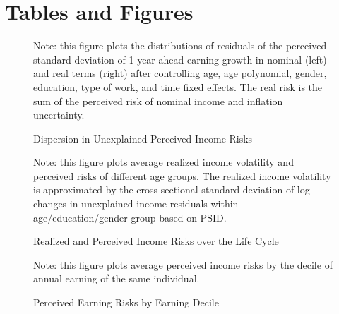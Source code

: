                         \newpage 
   
  \section*{Tables and Figures} 
    
    
        \begin{figure}[!ht]
    \caption{Dispersion in Unexplained Perceived Income Risks}
    \label{fig:histmoms}
	\begin{center}
\end{center}
    \begin{flushleft}Note: this figure plots the distributions of residuals of the perceived standard deviation of 1-year-ahead earning growth in nominal (left) and real terms (right) after controlling age, age polynomial, gender, education, type of work, and time fixed effects. The real risk is the sum of the perceived risk of nominal income and inflation uncertainty.\end{flushleft}
    \end{figure}
    
    \clearpage
    
    \begin{figure}[!ht]
    	\caption{Realized and Perceived Income Risks over the Life Cycle}
    	\label{fig:age_compare}
    	\begin{center}\end{center}
    	\begin{flushleft}Note: this figure plots average realized income volatility and perceived risks of different age groups. The realized income volatility is approximated by the cross-sectional standard deviation of log changes in unexplained income residuals within age/education/gender group based on PSID.\end{flushleft}
    \end{figure}

    \clearpage
    \begin{figure}[!ht]
    	\caption{Perceived Earning Risks by Earning Decile}
    	\label{fig:barplot_byinc}
    	\begin{center}\end{center}
    \begin{flushleft}Note: this figure plots average perceived income risks by the decile of annual earning of the same individual.\end{flushleft}
    \end{figure}
    

